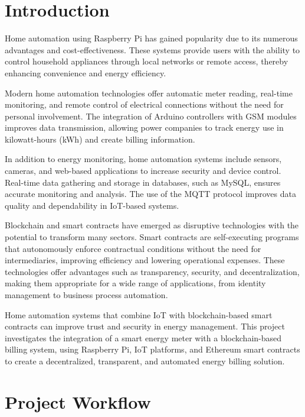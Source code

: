 \documentclass[a4paper,12pt]{report}
\begin{document}
\tableofcontents
\newpage

\chapter{Introduction}
Home automation using Raspberry Pi has gained popularity due to its numerous advantages and cost-effectiveness. These systems provide users with the ability to control household appliances through local networks or remote access, thereby enhancing convenience and energy efficiency\cite{jain2014raspberry}. 

Modern home automation technologies offer automatic meter reading, real-time monitoring, and remote control of electrical connections without the need for personal involvement\cite{chaudhari2017smart}.  The integration of Arduino controllers with GSM modules improves data transmission, allowing power companies to track energy use in kilowatt-hours (kWh) and create billing information\cite{rahman2015arduino}.

In addition to energy monitoring, home automation systems include sensors, cameras, and web-based applications to increase security and device control\cite{patchava2015smart}.  Real-time data gathering and storage in databases, such as MySQL, ensures accurate monitoring and analysis.  The use of the MQTT protocol improves data quality and dependability in IoT-based systems\cite{Atmoko_2017}.

Blockchain and smart contracts have emerged as disruptive technologies with the potential to transform many sectors.  Smart contracts are self-executing programs that autonomously enforce contractual conditions without the need for intermediaries, improving efficiency and lowering operational expenses\cite{10.1145/3328833.3328857}.  These technologies offer advantages such as transparency, security, and decentralization, making them appropriate for a wide range of applications, from identity management to business process automation\cite{chaudhari2017smart}.

 Home automation systems that combine IoT with blockchain-based smart contracts can improve trust and security in energy management.  This project investigates the integration of a smart energy meter with a blockchain-based billing system, using Raspberry Pi, IoT platforms, and Ethereum smart contracts to create a decentralized, transparent, and automated energy billing solution.


\chapter{Project Workflow}
\end{document}
